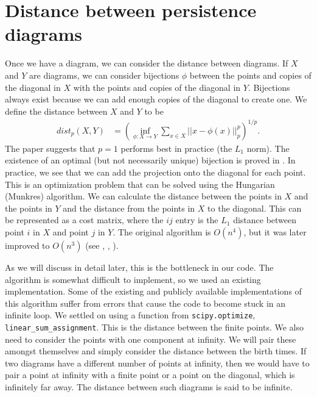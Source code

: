 \documentclass[codesnippet]{jss}
\begin{document}
\section[Distance diagrams]{Distance between persistence diagrams}
Once we have a diagram, we can consider the distance between diagrams.  If $X$ and $Y$ are diagrams, we can consider bijections $\phi$ between the points and copies of the diagonal in $X$ with the points and copies of the diagonal in $Y$.  Bijections always exist because we can add enough copies of the diagonal to create one.  We define the distance between $X$ and $Y$ to be
\begin{align}
dist_p(X,Y) &= \left(\inf_{\phi: X \to Y}\sum_{x \in X} ||x - \phi(x)||_p^p\right)^{1/p}.
\end{align}
The paper suggests that $p=1$ performs best in practice (the $L_1$ norm).  The existence of an optimal (but not necessarily unique) bijection is proved in \cite{turn13}.    In practice, we see that we can add the projection onto the diagonal for each point.  This is an optimization problem that can be solved using the Hungarian (Munkres) algorithm.  We can calculate the distance between the points in $X$ and the points in $Y$ and the distance from the points in $X$ to the diagonal.  This can be represented as a cost matrix, where the $ij$ entry is the $L_1$ distance between point $i$ in $X$ and point $j$ in $Y$.  The original algorithm is $O(n^4)$, but it was later improved to $O(n^3)$ (see \cite{kuhn55}, \cite{kuhn56}, \cite{munk57}).  

As we will discuss in detail later, this is the bottleneck in our code.  The algorithm is somewhat difficult to implement, so we used an existing implementation.  Some of the existing and publicly available implementations of this algorithm suffer from errors that cause the code to become stuck in an infinite loop.  We settled on using a function from \texttt{scipy.optimize}, \texttt{linear\_sum\_assignment}.  This is the distance between the finite points.  We also need to consider the points with one component at infinity.  We will pair these amongst themselves and simply consider the distance between the birth times.  If two diagrams have a different number of points at infinity, then we would have to pair a point at infinity with a finite point or a point on the diagonal, which is infinitely far away.  The distance between such diagrams is said to be infinite.  
\end{document}
